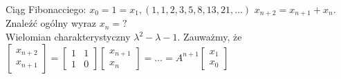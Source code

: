 \documentclass[../main.tex]{subfiles}
\begin{document}
Ciąg Fibonacciego: $x_0=1=x_1, (1,1,2,3,5,8,13,21,\ldots)$
$x_{n+2} = x_{n+1}+x_n$. Znaleźć ogólny wyraz $x_n = ?$\\
    Wielomian charakterystyczny $\lambda^2 - \lambda - 1$. Zauważmy, że $\begin{bmatrix} x_{n+2}\\x_{n+1} \end{bmatrix} = \begin{bmatrix} 1&1\\1&0 \end{bmatrix} \begin{bmatrix} x_{n+1}\\x_n \end{bmatrix} = \ldots = A^{n+1}\begin{bmatrix} x_1\\x_0 \end{bmatrix} $
\end{document}
